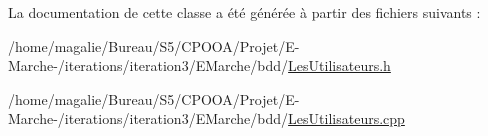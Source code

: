 La documentation de cette classe a été générée à partir des fichiers suivants \-:\begin{DoxyCompactItemize}
\item 
/home/magalie/\-Bureau/\-S5/\-C\-P\-O\-O\-A/\-Projet/\-E-\/\-Marche-\//iterations/iteration3/\-E\-Marche/bdd/\hyperlink{_les_utilisateurs_8h}{Les\-Utilisateurs.\-h}\item 
/home/magalie/\-Bureau/\-S5/\-C\-P\-O\-O\-A/\-Projet/\-E-\/\-Marche-\//iterations/iteration3/\-E\-Marche/bdd/\hyperlink{_les_utilisateurs_8cpp}{Les\-Utilisateurs.\-cpp}\end{DoxyCompactItemize}
